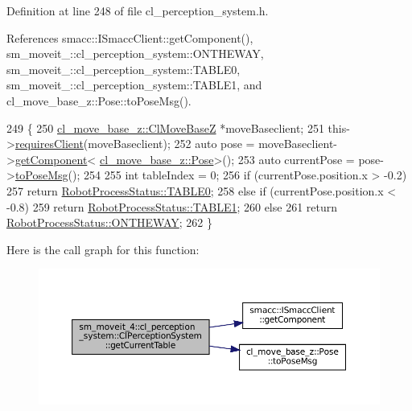Definition at line 248 of file cl\+\_\+perception\+\_\+system.\+h.



References smacc\+::\+I\+Smacc\+Client\+::get\+Component(), sm\+\_\+moveit\+\_\+::cl\+\_\+perception\+\_\+system\+::\+O\+N\+T\+H\+E\+W\+AY, sm\+\_\+moveit\+\_\+::cl\+\_\+perception\+\_\+system\+::\+T\+A\+B\+L\+E0, sm\+\_\+moveit\+\_\+::cl\+\_\+perception\+\_\+system\+::\+T\+A\+B\+L\+E1, and cl\+\_\+move\+\_\+base\+\_\+z\+::\+Pose\+::to\+Pose\+Msg().


\begin{DoxyCode}
249             \{
250                 \hyperlink{classcl__move__base__z_1_1ClMoveBaseZ}{cl\_move\_base\_z::ClMoveBaseZ} *moveBaseclient;
251                 this->\hyperlink{classsmacc_1_1ISmaccClient_a7a9990a2f3e35d547671188d69fee520}{requiresClient}(moveBaseclient);
252                 \textcolor{keyword}{auto} pose = moveBaseclient->\hyperlink{classsmacc_1_1ISmaccClient_adef78db601749ca63c19e74a27cb88cc}{getComponent}<
      \hyperlink{classcl__move__base__z_1_1Pose}{cl\_move\_base\_z::Pose}>();
253                 \textcolor{keyword}{auto} currentPose = pose->\hyperlink{classcl__move__base__z_1_1Pose_a9faf8c6b437ff6b19c8bddd692908dca}{toPoseMsg}();
254 
255                 \textcolor{keywordtype}{int} tableIndex = 0;
256                 \textcolor{keywordflow}{if} (currentPose.position.x > -0.2)
257                     \textcolor{keywordflow}{return} \hyperlink{namespacesm__moveit__4_1_1cl__perception__system_a11dfa58fc66f2d368b894a9f1fec870ea1fd65c0ced0ead229bf6dd6a59067a4f}{RobotProcessStatus::TABLE0};
258                 \textcolor{keywordflow}{else} \textcolor{keywordflow}{if} (currentPose.position.x < -0.8)
259                     \textcolor{keywordflow}{return} \hyperlink{namespacesm__moveit__4_1_1cl__perception__system_a11dfa58fc66f2d368b894a9f1fec870ea5b22e42e5d94a94037a4486a4976c49d}{RobotProcessStatus::TABLE1};
260                 \textcolor{keywordflow}{else}
261                     \textcolor{keywordflow}{return} \hyperlink{namespacesm__moveit__4_1_1cl__perception__system_a11dfa58fc66f2d368b894a9f1fec870ea92f7ea3097b3fdb1b7a25669cfc1b8bd}{RobotProcessStatus::ONTHEWAY};
262             \}
\end{DoxyCode}
Here is the call graph for this function\+:
\nopagebreak
\begin{figure}[H]
\begin{center}
\leavevmode
\includegraphics[width=350pt]{classsm__moveit__4_1_1cl__perception__system_1_1ClPerceptionSystem_aa08e0d656ca31a618c0a4c496afe36af_cgraph}
\end{center}
\end{figure}

